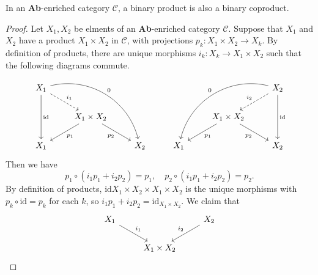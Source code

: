 \begin{proposition}
  In an \textbf{Ab}-enriched category $ \mathcal{C} $, a binary product is also a binary coproduct.
\end{proposition}
\begin{proof}
  Let $ X_1, X_2 $ be elments of an \textbf{Ab}-enriched category $ \mathcal{C} $. Suppose that $ X_1 $ and $ X_2 $ have a product $ X_1 \times X_2 $ in $ \mathcal{C} $, with projections $ p_k: X_1 \times X_2 \to X_k $. By definition of products, there are unique morphisms $ i_k:X_k \to X_1 \times X_2 $ such that the following diagrams commute.
\[\begin{tikzcd}
    {X_1} &&&&& {X_2} \\
    & {X_1 \times X_2} &&& {X_1\times X_2} \\
    {X_1} && {X_2} & {X_1} && {X_2}
    \arrow["{\text{id}}", from=1-1, to=3-1]
    \arrow["{i_1}", dashed, from=1-1, to=2-2]
    \arrow["0", bend left=45, from=1-1, to=3-3]
    \arrow["{p_2}"', from=2-2, to=3-3]
    \arrow["{p_1}", from=2-2, to=3-1]
    \arrow["{\text{id}}", from=1-6, to=3-6]
    \arrow["0"', bend right=45, from=1-6, to=3-4]
    \arrow["{i_2}"', dashed, from=1-6, to=2-5]
    \arrow["{p_1}", from=2-5, to=3-4]
    \arrow["{p_2}"', from=2-5, to=3-6]
\end{tikzcd}\]
  Then we have
  \begin{equation*}
  p_1\circ (i_1 p_1 + i_2p_2) = p_1, \quad p_2\circ(i_1p_1 + i_2p_2) = p_2.
  \end{equation*}
  By definition of products, $ \text{id} X_1 \times X_2 \times X_1 \times X_2 $ is the unique morphisms with $ p_k \circ \text{id}=p_k $ for each $ k $, so $ i_1p_1 + i_2p_2 = \text{id}_{X_1 \times X_2} $. We claim that
  \[\begin{tikzcd}
	{X_1} && {X_2} \\
	& {X_1\times X_2}
	\arrow["{i_1}", from=1-1, to=2-2]
	\arrow["{i_2}"', from=1-3, to=2-2]
\end{tikzcd}\]


\end{proof}
